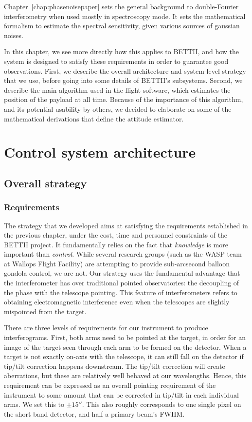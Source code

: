 Chapter~\ref{chap:phasenoisepaper} sets the general background to double-Fourier interferometry when used mostly in spectroscopy mode. It sets the mathematical formalism to estimate the spectral sensitivity, given various sources of gaussian noises. 

In this chapter, we see more directly how this applies to BETTII, and how the system is designed to satisfy these requirements in order to guarantee good observations. First, we describe the overall architecture and system-level strategy that we use, before going into some details of BETTII's subsystems. Second, we describe the main algorithm used in the flight software, which estimates the position of the payload at all time. Because of the importance of this algorithm, and its potential usability by others, we decided to elaborate on some of the mathematical derivations that define the attitude estimator.


\section{Control system architecture}
\label{sec:Chap3-ControlSystemArchitecture}

\subsection{Overall strategy}

\subsubsection{Requirements}
The strategy that we developed aims at satisfying the requirements established in the previous chapter, under the cost, time and personnel constraints of the BETTII project. It fundamentally relies on the fact that \textit{knowledge} is more important than \textit{control}. While several research groups (such as the WASP team at Wallops Flight Facility) are attempting to provide sub-arcsecond balloon gondola control, we are not. Our strategy uses the fundamental advantage that the interferometer has over traditional pointed observatories: the decoupling of the phase with the telescope pointing. This feature of interferometers refers to obtaining electromagnetic interference even when the telescopes are slightly mispointed from the target. 

There are three levels of requirements for our instrument to produce interferograms. First, both arms need to be pointed at the target, in order for an image of the target seen through each arm to be formed on the detector. When a target is not exactly on-axis with the telescope, it can still fall on the detector if tip/tilt correction happens downstream. The tip/tilt correction will create aberrations, but these are relatively well behaved at our wavelengths. Hence, this requirement can be expressed as an overall pointing requirement of the instrument to some amount that can be corrected in tip/tilt in each individual arms. We set this to $\pm\ang{;;15}$. This also roughly corresponds to one single pixel on the short band detector, and half a primary beam's FWHM.


